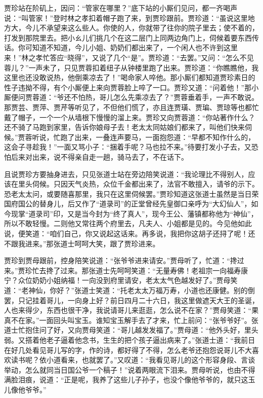 \documentclass[12pt,oneside]{book}
\begin{document}
贾珍站在阶矶上，因问：“管家在哪里？”底下站的小厮们见问，都一齐喝声说：“叫管家！”登时林之孝扣着帽子跑了来，到贾珍跟前。贾珍道：“虽说这里地方大，今儿不承望来这么些人。你使的人，你就带了往你的院子里去；使不着的，打发到那院里去。把小ㄠ儿们挑几个在这二层门上同两边角门上，伺候着要东西传话。你可知道不知道，今儿小姐、奶奶们都出来了，一个闲人也不许到这里来！”林之孝忙答应“晓得”，又说了几个“是”。贾珍道：“去罢。”又问：“怎么不见蓉儿？”一声未了，只见贾蓉扣着纽子从钟楼里跑了出来。贾珍道：“你瞧瞧他，我这里也还没敢说热，他倒乘凉去了！”喝命家人啐他。那小厮们都知道贾珍素日的性子违拗不得，有个小厮便上来向贾蓉脸上啐了一口。贾珍又道：“问着他！”那小厮便问贾蓉道：“爷还不怕热，哥儿怎么先乘凉去了？”贾蓉垂着手，一声不敢说。那贾芸、贾萍、贾芹等听见了，不但他们慌了，亦且连贾璜、贾㻞、贾琼等也都忙戴了帽子，一个一个从墙根下慢慢的溜上来。贾珍又向贾蓉道：“你站著作什么？还不骑了马跑到家里，告诉你娘母子去！老太太同姑娘们都来了，叫他们快来伺候。”贾蓉听说，忙跑了出来，一叠连声要马，一面抱怨道：“早都不知作什么的，这会子寻趁我！”一面又骂小子：“捆着手呢？马也拉不来。”待要打发小子去，又恐怕后来对出来，说不得亲自走一趟，骑马去了，不在话下。

且说贾珍方要抽身进去，只见张道士站在旁边陪笑说道：“我论理比不得别人，应该在里头伺候。只因天气炎热，众位千金都出来了，法官不敢擅入，请爷的示下。恐老太太问，或要随喜那里，我只在这里伺候罢。”贾珍知道这张道士虽然是当日荣国府国公的替身儿，后又作了“道录司”的正堂曾经先皇御口亲呼为“大幻仙人”，如今现掌“道录司”印，又是当今封为“终了真人”，现今王公、藩镇都称他为“神仙”，所以不敢轻慢。二则他又常往两个府里去，凡夫人、小姐都是见的。今见他如此说，便笑道：“咱们自己，你又说起这话来。再多说，我把你这胡子还挦了呢！还不跟我进来。”那张道士呵呵大笑，跟了贾珍进来。

贾珍到贾母跟前，控身陪笑说道：“张爷爷进来请安。”贾母听了，忙道：“搀过来。”贾珍忙去搀了过来。那张道士先呵呵笑道：“无量寿佛！老祖宗一向福寿康宁？众位奶奶小姐纳福！一向没到府里请安，老太太气色越发好了。”贾母笑道：“老神仙，你好？”张道士笑道：“托老太太万福万寿，小道也还康健。别的倒罢，只记挂着哥儿，一向身上好？前日四月二十六日，我这里做遮天大王的圣诞，人也来得少，东西也很干净，我说请哥儿来逛逛，怎么说不在家？”贾母笑道：“果真不在家。”一面回头叫宝玉。谁知宝玉解手去了才来，忙上前问：“张爷爷好”。张道士忙抱住问了好，又向贾母笑道：“哥儿越发发福了。”贾母道：“他外头好，里头弱。又搭着他老子逼着他念书，生生的把个孩子逼出病来了。”张道士道：“我前日在好几处看见哥儿写的字，作的诗，都好得了不得，怎么老爷还抱怨说哥儿不大喜欢读书呢？依小道看来，也就罢了。”又叹道：“我看见哥儿的这个形容身段、言谈举动，怎么就同当日国公爷一个稿子！”说着两眼流下泪来。贾母听说，也由不得满脸泪痕，说道：“正是呢，我养了这些儿子孙子，也没个像他爷爷的，就只这玉儿像他爷爷。”
\end{document}
